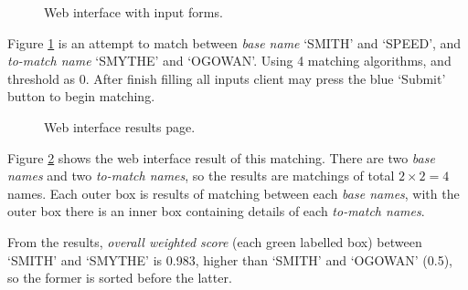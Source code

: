 \begin{figure}[H]
\centering
\captionsetup{justification=centering}
\caption{Web interface with input forms.}
\label{fig:wi}
\end{figure}

Figure \ref{fig:wi} is an attempt to match between \emph{base name} `SMITH'
and `SPEED', and \emph{to-match name} `SMYTHE' and `O\textquotesingle GOWAN'. Using 4 matching
algorithms, and threshold as 0. After finish filling all inputs client
may press the blue `Submit' button to begin matching.

\begin{figure}[H]
\centering
\captionsetup{justification=centering}
\caption{Web interface results page.}
\label{fig:wi_res}
\end{figure}

Figure \ref{fig:wi_res} shows the web interface result of this matching.
There are two \emph{base names} and two \emph{to-match names}, so the results
are matchings of total $2 \times 2 = 4$ names. Each outer box is results
of matching between each \emph{base names}, with the outer box there
is an inner box containing details of each \emph{to-match names}.

From the results, \emph{overall weighted score}
(each green labelled box) between `SMITH' and `SMYTHE'
is 0.983, higher than `SMITH' and `O\textquotesingle GOWAN' (0.5), so the former is sorted
before the latter.
